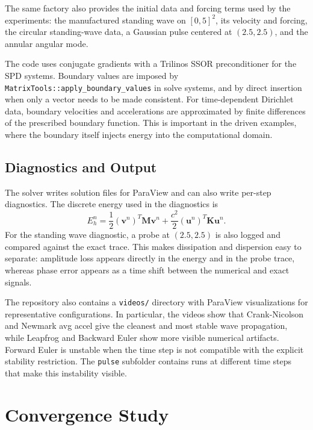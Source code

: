 \documentclass[11pt,a4paper]{article}
\newcommand{\Uh}{\mathbf{u}}
\newcommand{\Vh}{\mathbf{v}}
\newcommand{\M}{\mathbf{M}}
\newcommand{\K}{\mathbf{K}}
\begin{document}
The same factory also provides the initial data and forcing terms used by the
experiments: the manufactured standing wave on $[0,5]^2$, its velocity and
forcing, the circular standing-wave data, a Gaussian pulse centered at
$(2.5,2.5)$, and the annular angular mode.

The code uses conjugate gradients with a Trilinos SSOR preconditioner for the
SPD systems.  Boundary values are imposed by \texttt{MatrixTools::apply\_boundary\_values}
in solve systems, and by direct insertion when only a vector needs to be made
consistent.  For time-dependent Dirichlet data, boundary velocities and
accelerations are approximated by finite differences of the prescribed boundary
function.  This is important in the driven examples, where the boundary itself
injects energy into the computational domain.

\subsection{Diagnostics and Output}

The solver writes solution files for ParaView and can also write per-step
diagnostics.  The discrete energy used in the diagnostics is
\begin{equation}
E_h^n
=\frac12(\Vh^n)^T\M\Vh^n
 +\frac{c^2}{2}(\Uh^n)^T\K\Uh^n .
\label{eq:discrete-energy}
\end{equation}
For the standing wave diagnostic, a probe at $(2.5,2.5)$ is also logged and
compared against the exact trace.  This makes dissipation and dispersion easy to
separate: amplitude loss appears directly in the energy and in the probe trace,
whereas phase error appears as a time shift between the numerical and exact
signals.

The repository also contains a \texttt{videos/} directory with ParaView
visualizations for representative configurations. In particular, the
videos show that Crank-Nicolson and Newmark avg accel give the
cleanest and most stable wave propagation, while Leapfrog and Backward Euler
show more visible numerical artifacts.  Forward Euler is unstable when the time
step is not compatible with the explicit stability restriction. The \texttt{pulse}
subfolder contains runs at different time steps that make this instability
visible.

\section{Convergence Study}
\end{document}
